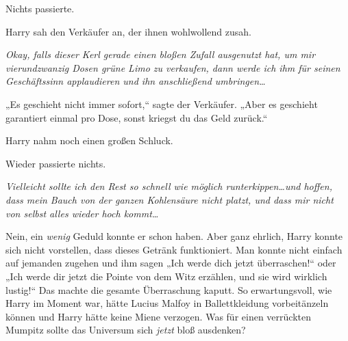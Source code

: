 Nichts passierte.

Harry sah den Verkäufer an, der ihnen wohlwollend zusah.

\emph{Okay, falls dieser Kerl gerade einen bloßen Zufall ausgenutzt hat, um mir vierundzwanzig Dosen grüne Limo zu verkaufen, dann werde ich ihm für seinen Geschäftssinn applaudieren und ihn anschließend umbringen…}

„Es geschieht nicht immer sofort,“ sagte der Verkäufer. „Aber es geschieht garantiert einmal pro Dose, sonst kriegst du das Geld zurück.“

Harry nahm noch einen großen Schluck.

Wieder passierte nichts.

\emph{Vielleicht sollte ich den Rest so schnell wie möglich runterkippen…und hoffen, dass mein Bauch von der ganzen Kohlensäure nicht platzt, und dass mir nicht von selbst alles wieder hoch kommt…}

Nein, ein \emph{wenig} Geduld konnte er schon haben. Aber ganz ehrlich, Harry konnte sich nicht vorstellen, dass dieses Getränk funktioniert. Man konnte nicht einfach auf jemanden zugehen und ihm sagen „Ich werde dich jetzt überraschen!“ oder „Ich werde dir jetzt die Pointe von dem Witz erzählen, und sie wird wirklich lustig!“ Das machte die gesamte Überraschung kaputt. So erwartungsvoll, wie Harry im Moment war, hätte Lucius Malfoy in Ballettkleidung vorbeitänzeln können und Harry hätte keine Miene verzogen. Was für einen verrückten Mumpitz sollte das Universum sich \emph{jetzt} bloß ausdenken?

